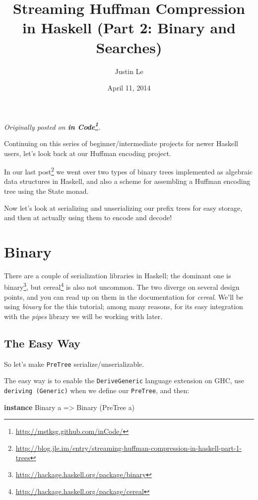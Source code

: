 \documentclass[]{article}
\title{Streaming Huffman Compression in Haskell (Part 2: Binary and Searches)}
\author{Justin Le}
\date{April 11, 2014}
\newenvironment{Shaded}{}{}
\newcommand{\KeywordTok}[1]{\textcolor[rgb]{0.00,0.44,0.13}{\textbf{{#1}}}}
\newcommand{\DataTypeTok}[1]{\textcolor[rgb]{0.56,0.13,0.00}{{#1}}}
\newcommand{\OtherTok}[1]{\textcolor[rgb]{0.00,0.44,0.13}{{#1}}}
\newcommand{\NormalTok}[1]{{#1}}
\renewcommand{\href}[2]{#2\footnote{\url{#1}}}
\begin{document}
\maketitle

\emph{Originally posted on
\textbf{\href{http://mstksg.github.com/inCode/}{in Code}}.}

Continuing on this series of beginner/intermediate projects for newer
Haskell users, let's look back at our Huffman encoding project.

In our
\href{http://blog.jle.im/entry/streaming-huffman-compression-in-haskell-part-1-trees}{last
post} we went over two types of binary trees implemented as algebraic
data structures in Haskell, and also a scheme for assembling a Huffman
encoding tree using the State monad.

Now let's look at serializing and unserializing our prefix trees for
easy storage, and then at actually using them to encode and decode!

\section{Binary}\label{binary}

There are a couple of serialization libraries in Haskell; the dominant
one is \href{http://hackage.haskell.org/package/binary}{binary}, but
\href{http://hackage.haskell.org/package/cereal}{cereal} is also not
uncommon. The two diverge on several design points, and you can read up
on them in the documentation for \emph{cereal}. We'll be using
\emph{binary} for the this tutorial; among many reasons, for its easy
integration with the \emph{pipes} library we will be working with later.

\subsection{The Easy Way}\label{the-easy-way}

So let's make \texttt{PreTree} serialize/unserializable.

The easy way is to enable the \texttt{DeriveGeneric} language extension
on GHC, use \texttt{deriving\ (Generic)} when we define our
\texttt{PreTree}, and then:

\begin{Shaded}
\begin{Highlighting}[]
\KeywordTok{instance} \DataTypeTok{Binary} \NormalTok{a }\OtherTok{=>} \DataTypeTok{Binary} \NormalTok{(}\DataTypeTok{PreTree} \NormalTok{a)}
\end{Highlighting}
\end{Shaded}
\end{document}

